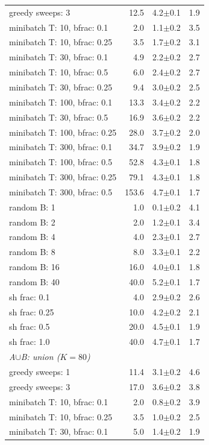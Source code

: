 \begin{tabular}{lrrr}
greedy sweeps: 3 & 12.5 & 4.2$\pm$0.1 & 1.9 \\
minibatch T: 10, bfrac: 0.1 & 2.0 & 1.1$\pm$0.2 & 3.5 \\
minibatch T: 10, bfrac: 0.25 & 3.5 & 1.7$\pm$0.2 & 3.1 \\
minibatch T: 30, bfrac: 0.1 & 4.9 & 2.2$\pm$0.2 & 2.7 \\
minibatch T: 10, bfrac: 0.5 & 6.0 & 2.4$\pm$0.2 & 2.7 \\
minibatch T: 30, bfrac: 0.25 & 9.4 & 3.0$\pm$0.2 & 2.5 \\
minibatch T: 100, bfrac: 0.1 & 13.3 & 3.4$\pm$0.2 & 2.2 \\
minibatch T: 30, bfrac: 0.5 & 16.9 & 3.6$\pm$0.2 & 2.2 \\
minibatch T: 100, bfrac: 0.25 & 28.0 & 3.7$\pm$0.2 & 2.0 \\
minibatch T: 300, bfrac: 0.1 & 34.7 & 3.9$\pm$0.2 & 1.9 \\
minibatch T: 100, bfrac: 0.5 & 52.8 & 4.3$\pm$0.1 & 1.8 \\
minibatch T: 300, bfrac: 0.25 & 79.1 & 4.3$\pm$0.1 & 1.8 \\
minibatch T: 300, bfrac: 0.5 & 153.6 & 4.7$\pm$0.1 & 1.7 \\
random B: 1 & 1.0 & 0.1$\pm$0.2 & 4.1 \\
random B: 2 & 2.0 & 1.2$\pm$0.1 & 3.4 \\
random B: 4 & 4.0 & 2.3$\pm$0.1 & 2.7 \\
random B: 8 & 8.0 & 3.3$\pm$0.1 & 2.2 \\
random B: 16 & 16.0 & 4.0$\pm$0.1 & 1.8 \\
random B: 40 & 40.0 & 5.2$\pm$0.1 & 1.7 \\
sh frac: 0.1 & 4.0 & 2.9$\pm$0.2 & 2.6 \\
sh frac: 0.25 & 10.0 & 4.2$\pm$0.2 & 2.1 \\
sh frac: 0.5 & 20.0 & 4.5$\pm$0.1 & 1.9 \\
sh frac: 1.0 & 40.0 & 4.7$\pm$0.1 & 1.7 \\
\multicolumn{4}{l}{\emph{A$\cup$B: union ($K{=}80$)}} \\
greedy sweeps: 1 & 11.4 & 3.1$\pm$0.2 & 4.6 \\
greedy sweeps: 3 & 17.0 & 3.6$\pm$0.2 & 3.8 \\
minibatch T: 10, bfrac: 0.1 & 2.0 & 0.8$\pm$0.2 & 3.9 \\
minibatch T: 10, bfrac: 0.25 & 3.5 & 1.0$\pm$0.2 & 2.5 \\
minibatch T: 30, bfrac: 0.1 & 5.0 & 1.4$\pm$0.2 & 1.9 \\

\end{tabular}
